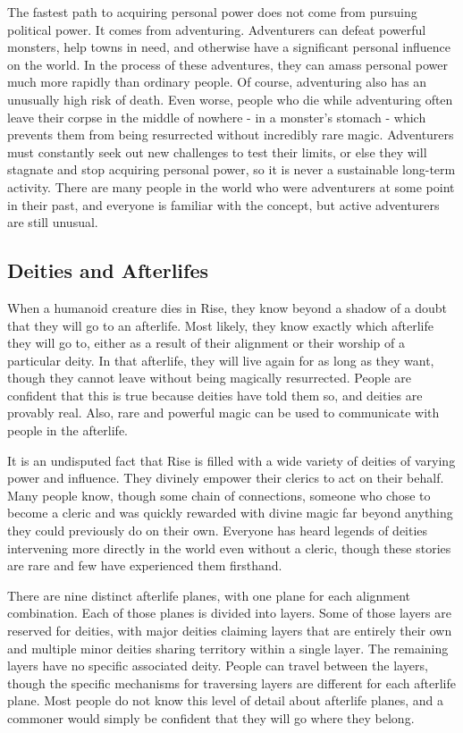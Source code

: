         The fastest path to acquiring personal power does not come from pursuing political power.
        It comes from adventuring.
        Adventurers can defeat powerful monsters, help towns in need, and otherwise have a significant personal influence on the world.
        In the process of these adventures, they can amass personal power much more rapidly than ordinary people.
        Of course, adventuring also has an unusually high risk of death.
        Even worse, people who die while adventuring often leave their corpse in the middle of nowhere - in a monster's stomach - which prevents them from being resurrected without incredibly rare magic.
        Adventurers must constantly seek out new challenges to test their limits, or else they will stagnate and stop acquiring personal power, so it is never a sustainable long-term activity.
        There are many people in the world who were adventurers at some point in their past, and everyone is familiar with the concept, but active adventurers are still unusual.

    \subsection{Deities and Afterlifes}\label{Deities and Afterlifes}
        When a humanoid creature dies in Rise, they know beyond a shadow of a doubt that they will go to an afterlife.
        Most likely, they know exactly which afterlife they will go to, either as a result of their alignment or their worship of a particular deity.
        In that afterlife, they will live again for as long as they want, though they cannot leave without being magically resurrected.
        People are confident that this is true because deities have told them so, and deities are provably real.
        Also, rare and powerful magic can be used to communicate with people in the afterlife.

        It is an undisputed fact that Rise is filled with a wide variety of deities of varying power and influence.
        They divinely empower their clerics to act on their behalf.
        Many people know, though some chain of connections, someone who chose to become a cleric and was quickly rewarded with divine magic far beyond anything they could previously do on their own.
        Everyone has heard legends of deities intervening more directly in the world even without a cleric, though these stories are rare and few have experienced them firsthand.

        There are nine distinct afterlife planes, with one plane for each alignment combination.
        Each of those planes is divided into layers.
        Some of those layers are reserved for deities, with major deities claiming layers that are entirely their own and multiple minor deities sharing territory within a single layer.
        The remaining layers have no specific associated deity.
        People can travel between the layers, though the specific mechanisms for traversing layers are different for each afterlife plane.
        Most people do not know this level of detail about afterlife planes, and a commoner would simply be confident that they will go where they belong.

